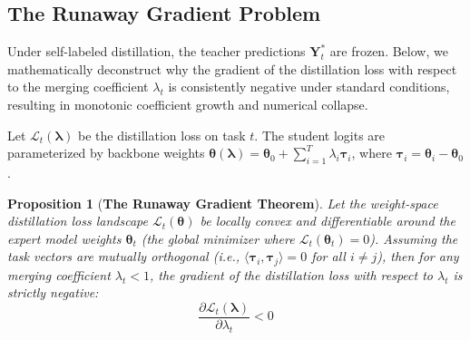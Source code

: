 \documentclass{article}
\theoremstyle{plain}
\newtheorem{proposition}[theorem]{Proposition}
\theoremstyle{definition}
\theoremstyle{remark}
\begin{document}
\subsection{The Runaway Gradient Problem}
Under self-labeled distillation, the teacher predictions $\mathbf{Y}_t^*$ are frozen. Below, we mathematically deconstruct why the gradient of the distillation loss with respect to the merging coefficient $\lambda_t$ is consistently negative under standard conditions, resulting in monotonic coefficient growth and numerical collapse.

Let $\mathcal{L}_t(\boldsymbol{\lambda})$ be the distillation loss on task $t$. The student logits are parameterized by backbone weights $\boldsymbol{\theta}(\boldsymbol{\lambda}) = \boldsymbol{\theta}_0 + \sum_{i=1}^T \lambda_i \boldsymbol{\tau}_i$, where $\boldsymbol{\tau}_i = \boldsymbol{\theta}_i - \boldsymbol{\theta}_0$.

\begin{proposition}[\textbf{The Runaway Gradient Theorem}]
Let the weight-space distillation loss landscape $\mathcal{L}_t(\boldsymbol{\theta})$ be locally convex and differentiable around the expert model weights $\boldsymbol{\theta}_t$ (the global minimizer where $\mathcal{L}_t(\boldsymbol{\theta}_t) = 0$). Assuming the task vectors are mutually orthogonal (i.e., $\langle \boldsymbol{\tau}_i, \boldsymbol{\tau}_j \rangle = 0$ for all $i \neq j$), then for any merging coefficient $\lambda_t < 1$, the gradient of the distillation loss with respect to $\lambda_t$ is strictly negative:
\begin{equation}
    \frac{\partial \mathcal{L}_t(\boldsymbol{\lambda})}{\partial \lambda_t} < 0
\end{equation}
\end{proposition}
\end{document}
